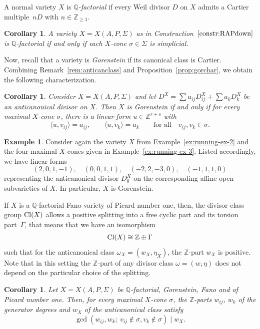 \documentclass[pdftex]{sigma}%
\newtheorem{coro}[thm]{Corollary}
\theoremstyle{definition}
\newtheorem{exam}[thm]{Example}
\def\Cl{{\rm Cl}}
\def\ZZ{{\mathbb Z}}
\def\QQ{{\mathbb Q}}
\def\bangle#1{{\langle #1 \rangle}}
\numberwithin{equation}{section}
\begin{document}
A normal variety $X$ is \emph{$\QQ$-factorial} if every
Weil divisor $D$ on $X$ admits a Cartier
multiple~$nD$ with $n \in \ZZ_{\ge 1}$.

\begin{coro}
A variety $X = X(A,P,\Sigma)$ as in
Construction~$\ref{constr:RAPdown}$
is $\QQ$-factorial if and only if
each $X$-cone $\sigma \in \Sigma$
is simplicial.
\end{coro}

Now, recall that a variety is \emph{Gorenstein} if its
canonical class is Cartier.
Combining Remark~\ref{rem:anticanclass} and
Proposition~\ref{prop:gorchar}, we obtain the
following characterization.

\begin{coro}
\label{cor:gor2div}
Consider $X = X(A,P,\Sigma)$ and let
$D^X = \sum a_{ij} D^X_{ij} + \sum a_k D^X_k$
be an anticanonical divisor on $X$.
Then $X$ is Gorenstein if and
only if for every maximal $X$-cone
$\sigma$, there is a linear form $u \in \ZZ^{r+s}$
with
\[
\bangle{u,v_{ij}} = a_{ij},\qquad
\bangle{u,v_k} = a_k\qquad
\text{for all}\quad v_{ij}, v_k \in \sigma.
\]
\end{coro}


\begin{exam}
\label{ex:running-ex-4}
Consider again the variety $X$
from Example~\ref{ex:running-ex-2}
and the four maximal $X$-cones
given in Example~\ref{ex:running-ex-3}.
Listed accordingly, we have linear forms
\[
(2,0,1,-1),
\quad
(0,0,1,1),
\quad
(-2,2,-3,0),
\quad
(-1,1,1,0)
\]
representing the anticanonical divisor $D^X_0$
on the corresponding affine open subvarieties of $X$.
In particular, $X$ is Gorenstein.
\end{exam}


If $X$ is a $\QQ$-factorial Fano variety of Picard
number one, then, the divisor class group $\Cl(X)$
allows a positive splitting into a free cyclic part and its
torsion part~$\Gamma$, that means that we have
an isomorphism
\[
\Cl(X) \cong \ZZ \oplus \Gamma
\]
such that for the anticanonical class
$\omega_X = (w_X,\eta_X)$, the $\ZZ$-part
$w_X$ is positive.
Note that in this setting the $\ZZ$-part
of any divisor class $\omega = (w,\eta)$
does not depend on the particular choice of the
splitting.


\begin{coro}
\label{prop:gor2div2}
Let $X = X(A,P,\Sigma)$ be $\QQ$-factorial, Gorenstein, Fano
and of Picard number one.
Then, for every maximal $X$-cone $\sigma$,
the $\ZZ$-parts $w_{ij}$, $w_k$ of the generator degrees
and $w_X$ of the anticanonical class satisfy
\[
\gcd(w_{ij},w_k; \ v_{ij} \not\in \sigma, v_k \not\in \sigma)
\mid
w_X.
\]
\end{coro}
\end{document}
